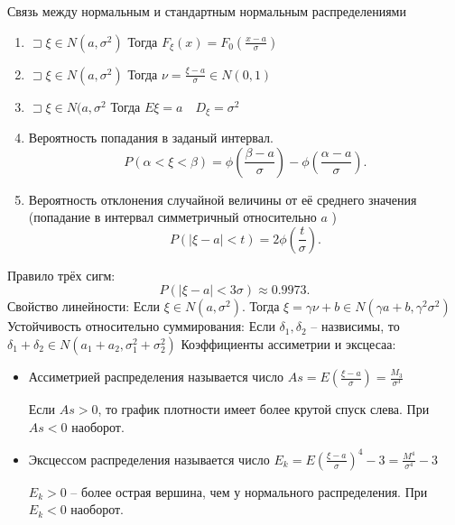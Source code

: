 Связь между нормальным и стандартным нормальным распределениями
\begin{enumerate}
    \item $\sqsupset \xi\in N(a,\sigma^2)$ Тогда $F_\xi(x) = F_0\left( \frac{x-a}{\sigma} \right) $
    \item $\sqsupset \xi\in N(a, \sigma^2)$ Тогда $\nu = \frac{\xi - a}{\sigma}\in N(0,1)$ 
    \item $\sqsupset \xi\in N(a,\sigma^2$ Тогда $E\xi = a\quad D_\xi = \sigma^2$
    \item Вероятность попадания в заданый интервал.
        \[
            P\left( \alpha < \xi < \beta \right) = \phi\left( \frac{\beta -a}{\sigma} \right)  - \phi\left( \frac{\alpha -a}{\sigma} \right) 
        .\] 
    \item Вероятность отклонения случайной величины от её среднего значения (попадание в интервал симметричный относительно $a$ )
        \[
            P\left( |\xi - a|<t \right)  = 2\phi\left( \frac{t}{\sigma} \right) 
        .\] 
\end{enumerate}

Правило трёх сигм:
\[
    P\left( |\xi - a| < 3\sigma \right)  \approx 0.9973
.\] 
Свойство линейности: Если $\xi\in N\left( a, \sigma^2 \right) $. Тогда $\xi = \gamma\nu + b\in N\left( \gamma a + b, \gamma^2\sigma^2 \right) $
Устойчивость относительно суммирования: Если $\delta_1, \delta_2$ -- назвисимы, то $\delta_1 + \delta_2\in N\left( a_1+a_2, \sigma_1^2 + \sigma_2^2 \right) $ 
Коэффициенты ассиметрии и эксцесаа:
\begin{itemize}
    \item Ассиметрией распределения называется число $As = E\left( \frac{\xi - a}{\sigma} \right) = \frac{M_3}{\sigma^3}$ 

        Если $As > 0$, то график плотности имеет более крутой спуск слева. При  $As < 0$ наоборот.
    \item Эксцессом распределения называется число  $E_k = E\left( \frac{\xi - a}{\sigma} \right) ^{4} - 3 = \frac{M^4}{\sigma^4} - 3$ 

        $E_k >0$ -- более острая вершина, чем у нормального распределения. При  $E_k < 0$ наоборот.
\end{itemize}
